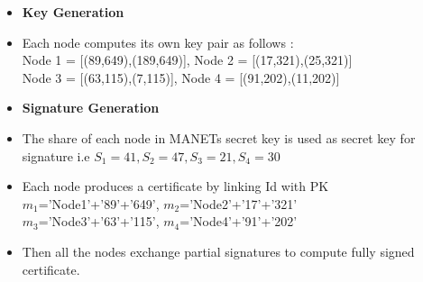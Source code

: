 \documentclass[11pt,a4paper]{llncs}
\begin{document}
\begin{itemize}
\item \textbf{Key Generation}
            \item Each node computes its own key pair as follows :\\
            Node 1 = [(89,649),(189,649)],
            Node 2 = [(17,321),(25,321)]\\
            Node 3 = [(63,115),(7,115)],
            Node 4 = [(91,202),(11,202)]
            
    \item \textbf{Signature Generation}
                \item The share of each node in MANETs secret key is used as secret key for signature i.e 
            $S_1 = 41, S_2 = 47 ,S_3 = 21, S_4 = 30$
            \item Each node produces a certificate by linking Id with PK\\
            $m_1$='Node1'+'89'+'649',
            $m_2$='Node2'+'17'+'321'\\
            $m_3$='Node3'+'63'+'115',
            $m_4$='Node4'+'91'+'202'
            \item Then all the nodes exchange partial signatures to compute fully signed certificate.
            \end{itemize}
\end{document}
